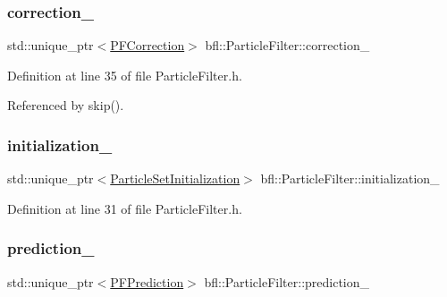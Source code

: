 \subsubsection{\texorpdfstring{correction\+\_\+}{correction\_}}
{\footnotesize\ttfamily std\+::unique\+\_\+ptr$<$\mbox{\hyperlink{classbfl_1_1PFCorrection}{P\+F\+Correction}}$>$ bfl\+::\+Particle\+Filter\+::correction\+\_\+\hspace{0.3cm}{\ttfamily [protected]}}



Definition at line 35 of file Particle\+Filter.\+h.



Referenced by skip().

\mbox{\label{classbfl_1_1ParticleFilter_aeb2120d4b99b0abc79ec3c2109952322}} 
\subsubsection{\texorpdfstring{initialization\+\_\+}{initialization\_}}
{\footnotesize\ttfamily std\+::unique\+\_\+ptr$<$\mbox{\hyperlink{classbfl_1_1ParticleSetInitialization}{Particle\+Set\+Initialization}}$>$ bfl\+::\+Particle\+Filter\+::initialization\+\_\+\hspace{0.3cm}{\ttfamily [protected]}}



Definition at line 31 of file Particle\+Filter.\+h.

\mbox{\label{classbfl_1_1ParticleFilter_ab86f707d29a823423fe35de37e8f9d8e}} 
\subsubsection{\texorpdfstring{prediction\+\_\+}{prediction\_}}
{\footnotesize\ttfamily std\+::unique\+\_\+ptr$<$\mbox{\hyperlink{classbfl_1_1PFPrediction}{P\+F\+Prediction}}$>$ bfl\+::\+Particle\+Filter\+::prediction\+\_\+\hspace{0.3cm}{\ttfamily [protected]}}



